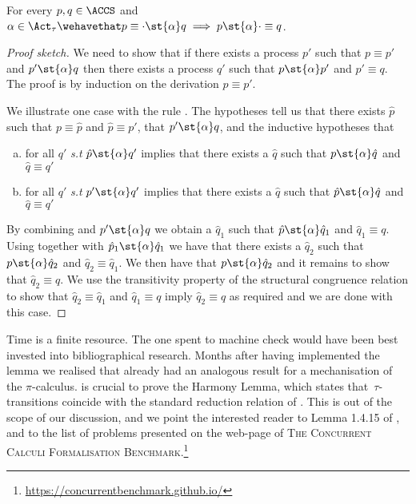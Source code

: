 \begin{lemma}%
  \label{lem:st-compatible-with-equiv}
  For every $p,q \in \ACCS$ and $\alpha \in \Act_{\tau} \wehavethat p \equiv \cdot \st{\alpha} q \implies p  \st{\alpha} \cdot \equiv q$.
\end{lemma}
\begin{proof}[Proof sketch]
  We need to show that if there exists a process $p'$ such that $p \equiv p'$
  and $p' \st{\alpha} q$ then there exists a process $q'$ such that $p \st{\alpha} p'$
  and $p' \equiv q$.
  The proof is by induction on the derivation $p \equiv p'$.

  We illustrate one case with the rule .
  The hypotheses tell us that there exists $\hat{p}$ such that $p \equiv \hat{p}$ and $\hat{p} \equiv p'$,
  that $p' \st{\alpha} q$,  and the inductive hypotheses that
  \begin{enumerate}[(a)]
  \item\label{pt:preharmony-case-1}
    for all $q'$ \textit{s.t} $\hat{p} \st{\alpha} q'$ implies that there exists a $\hat{q}$ such that $p \st{\alpha} \hat{q}$ and $\hat{q} \equiv q'$
  \item\label{pt:preharmony-case-2}
    for all $q'$ \textit{s.t} $p' \st{\alpha} q'$ implies that there exists a $\hat{q}$ such that $\hat{p} \st{\alpha} \hat{q}$ and $\hat{q} \equiv q'$
  \end{enumerate}
  By combining  and $p' \st{\alpha} q$ we obtain a
  $\hat{q}_1$ such that $\hat{p} \st{\alpha} \hat{q}_1$ and $\hat{q}_1 \equiv q$.
  Using  together with $\hat{p}_1 \st{\alpha} \hat{q}_1$ we have that
  there exists a $\hat{q}_2$ such that $p \st{\alpha} \hat{q}_2$ and $\hat{q}_2 \equiv \hat{q}_1$.
  We then have that $p \st{\alpha} \hat{q}_2$ and it remains to show that $\hat{q}_2 \equiv q$.
  We use the transitivity property of the structural congruence relation to show that
  $\hat{q}_2 \equiv \hat{q}_1$ and $\hat{q}_1 \equiv q$ imply $\hat{q}_2 \equiv q$ as required
  and we are done with this case.
\end{proof}
\noindent
Time is a finite resource. The one spent to machine check
 would have been best invested into bibliographical research.
Months after having implemented the lemma we realised that
\cite{DBLP:journals/entcs/AffeldtK08} already had 
an analogous result for a mechanisation of the $\pi$-calculus.
 is crucial to prove the Harmony Lemma,
which states that~$\tau$-transitions coincide with the standard reduction
relation of \ACCS. This is out of the scope of our discussion,
and we point the interested reader to Lemma 1.4.15 of
\cite{DBLP:books/daglib/0004377}, and to the list of problems
presented on the web-page of \textsc{The Concurrent Calculi Formalisation Benchmark}.\footnote{\url{https://concurrentbenchmark.github.io/}}


